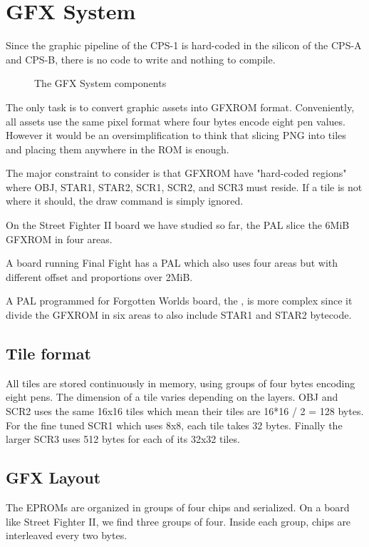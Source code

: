 \chapter{GFX System}
Since the graphic pipeline of the CPS-1 is hard-coded in the silicon of the CPS-A and CPS-B, there is no code to write and nothing to compile. 

\begin{figure}[H]
\caption*{The GFX System components}
\end{figure}

The only task is to convert graphic assets into GFXROM format. Conveniently, all assets use the same pixel format where four bytes encode eight pen values. However it would be an oversimplification to think that slicing PNG into tiles and placing them anywhere in the ROM is enough.

The major constraint to consider is that GFXROM have "hard-coded regions" where OBJ, STAR1, STAR2, SCR1, SCR2, and SCR3 must reside. If a tile is not where it should, the draw command is simply ignored.

On the Street Fighter II board we have studied so far, the  PAL slice the 6MiB GFXROM in four areas. 

A board running Final Fight has a  PAL which also uses four areas but with different offset and proportions over 2MiB. 

A PAL programmed for Forgotten Worlds board, the , is more complex since it divide the GFXROM in six areas to also include STAR1 and STAR2 bytecode.


\section{Tile format}
All tiles are stored continuously in memory, using groups of four bytes encoding eight pens. The dimension of a tile varies depending on the layers. OBJ and SCR2 uses the same 16x16 tiles which mean their tiles are 16*16 / 2 = 128 bytes. For the fine tuned SCR1 which uses 8x8, each tile takes 32 bytes. Finally the larger SCR3 uses 512 bytes for each of its 32x32 tiles.

\section{GFX Layout}
The EPROMs are organized in groups of four chips and serialized. On a board like Street Fighter II, we find three groups of four. Inside each group, chips are interleaved every two bytes.

